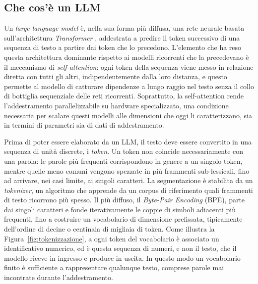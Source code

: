 \subsection{Che cos'è un LLM}

Un \emph{large language model} è, nella sua forma più diffusa, una rete neurale basata sull'architettura
\emph{Transformer} \cite{vaswani2017attention}, addestrata a predire il token successivo di una sequenza di testo a partire dai token che lo precedono. L'elemento che ha reso questa architettura dominante rispetto ai modelli ricorrenti che la precedevano è il meccanismo di \emph{self-attention}: ogni token della sequenza viene messo in relazione diretta con tutti gli altri, indipendentemente dalla loro distanza, e questo permette al modello di catturare dipendenze a lungo raggio nel testo senza il collo di bottiglia sequenziale delle reti ricorrenti. Soprattutto, la self-attention rende l'addestramento parallelizzabile su hardware specializzato, una condizione necessaria per scalare questi modelli alle dimensioni che oggi li caratterizzano, sia in termini di parametri sia di dati di addestramento.

Prima di poter essere elaborato da un LLM, il testo deve essere convertito in una sequenza di unità discrete, i \emph{token}. Un token non coincide necessariamente con una parola: le parole più frequenti corrispondono in genere a un singolo token, mentre quelle meno comuni vengono spezzate in più frammenti sub-lessicali, fino ad arrivare, nei casi limite, ai singoli caratteri. La segmentazione è stabilita da un \emph{tokenizer}, un algoritmo che apprende da un corpus di riferimento quali frammenti di testo ricorrono più spesso. Il più diffuso, il \emph{Byte-Pair Encoding} (BPE), parte dai singoli caratteri e fonde iterativamente le coppie di simboli adiacenti più frequenti, fino a costruire un vocabolario di dimensione prefissata, tipicamente dell'ordine di decine o centinaia di migliaia di token. Come illustra la Figura~\ref{fig:tokenizzazione}, a ogni token del vocabolario è associato un identificativo numerico, ed è questa sequenza di numeri, e non il testo, che il modello riceve in ingresso e produce in uscita. In questo modo un vocabolario finito è sufficiente a rappresentare qualunque testo, comprese parole mai incontrate durante l'addestramento.

